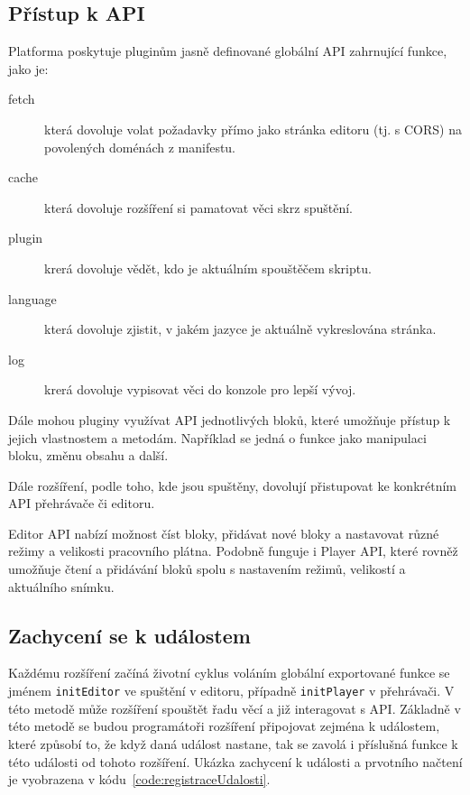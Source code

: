 \subsection{Přístup k API}

Platforma poskytuje pluginům jasně definované globální API zahrnující funkce, jako je:

\begin{description}
    \item[fetch] která dovoluje volat požadavky přímo jako stránka editoru (tj. s CORS) na povolených doménách z manifestu.
    \item[cache] která dovoluje rozšíření si pamatovat věci skrz spuštění.
    \item[plugin] krerá dovoluje vědět, kdo je aktuálním spouštěčem skriptu.
    \item[language] která dovoluje zjistit, v jakém jazyce je aktuálně vykreslována stránka.
    \item[log] krerá dovoluje vypisovat věci do konzole pro lepší vývoj.
\end{description}

Dále mohou pluginy využívat API jednotlivých bloků, které umožňuje přístup k jejich vlastnostem a metodám.
Například se jedná o funkce jako manipulaci bloku, změnu obsahu a další.

Dále rozšíření, podle toho, kde jsou spuštěny, dovolují přistupovat ke konkrétním API přehrávače či editoru.

Editor API nabízí možnost číst bloky, přidávat nové bloky a nastavovat různé režimy a velikosti pracovního plátna. 
Podobně funguje i Player API, které rovněž umožňuje čtení a přidávání bloků spolu s nastavením režimů, velikostí a aktuálního snímku.

\subsection{Zachycení se k událostem}

Každému rozšíření začíná životní cyklus voláním globální exportované funkce se jménem \texttt{initEditor} ve spuštění v editoru, případně \texttt{initPlayer} v přehrávači.
V této metodě může rozšíření spouštět řadu věcí a již interagovat s API.
Základně v této metodě se budou programátoři rozšíření připojovat zejména k událostem, které způsobí to, že když daná událost nastane, tak se zavolá i příslušná funkce k této události od tohoto rozšíření. 
Ukázka zachycení k události a prvotního načtení je vyobrazena v kódu~\ref{code:registraceUdalosti}.

